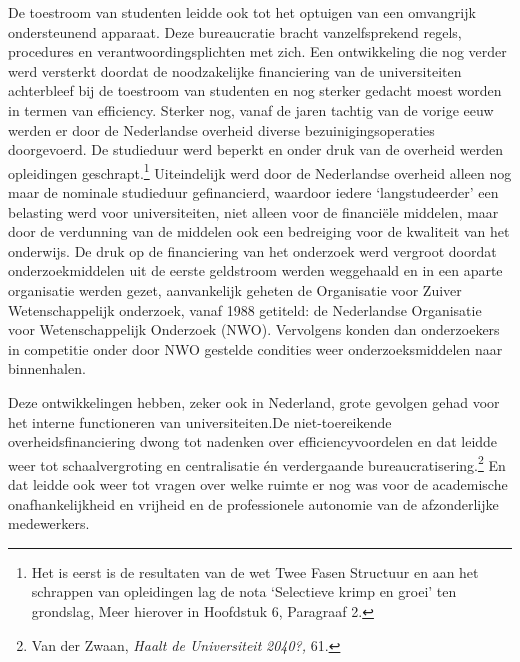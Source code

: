 \documentclass[smallauthor, chapterhaspagenum, nochapterinheader, pagenuminheader,  bigchapnum,medium2, tocpages, garamond, titleinheader]{jote-book}
\begin{document}
	De toestroom van studenten leidde ook tot het optuigen van een omvangrijk ondersteunend apparaat. Deze bureaucratie bracht vanzelfsprekend regels, procedures en verantwoordingsplichten met zich. Een ontwikkeling die nog verder werd versterkt doordat de noodzakelijke financiering van de universiteiten achterbleef bij de toestroom van studenten en nog sterker gedacht moest worden in termen van efficiency. Sterker nog, vanaf de jaren tachtig van de vorige eeuw werden er door de Nederlandse overheid diverse bezuinigingsoperaties doorgevoerd. De studieduur werd beperkt en onder druk van de overheid werden opleidingen geschrapt.\footnote{Het is eerst is de resultaten van de wet Twee Fasen Structuur en aan het schrappen van opleidingen lag de nota ‘Selectieve krimp en groei' ten grondslag, Meer hierover in Hoofdstuk 6, Paragraaf 2.} Uiteindelijk werd door de Nederlandse overheid alleen nog maar de nominale studieduur gefinancierd, waardoor iedere ‘langstudeerder' een belasting werd voor universiteiten, niet alleen voor de financiële middelen, maar door de verdunning van de middelen ook een bedreiging voor de kwaliteit van het onderwijs. De druk op de financiering van het onderzoek werd vergroot doordat onderzoekmiddelen uit de eerste geldstroom werden weggehaald en in een aparte organisatie werden gezet, aanvankelijk geheten de Organisatie voor Zuiver Wetenschappelijk onderzoek, vanaf 1988 getiteld: de Nederlandse Organisatie voor Wetenschappelijk Onderzoek (NWO). Vervolgens konden dan onderzoekers in competitie onder door NWO gestelde condities weer onderzoeksmiddelen naar binnenhalen.



	Deze ontwikkelingen hebben, zeker ook in Nederland, grote gevolgen gehad voor het interne functioneren van universiteiten.\fbox{ }De niet-toereikende overheidsfinanciering dwong tot nadenken over efficiencyvoordelen en dat leidde weer tot schaalvergroting en centralisatie én verdergaande bureaucratisering.\footnote{Van der Zwaan, \emph{Haalt de Universiteit }\emph{2040?,} 61. } En dat leidde ook weer tot vragen over welke ruimte er nog was voor de academische onafhankelijkheid en vrijheid en de professionele autonomie van de afzonderlijke medewerkers.
\end{document}
